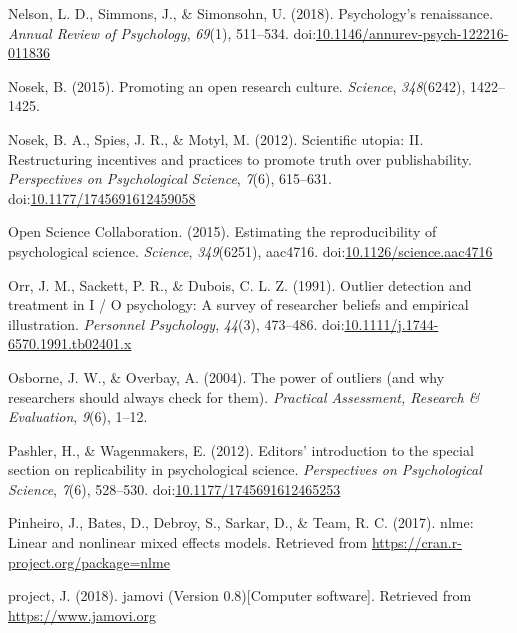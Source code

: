 \documentclass[english,,man]{apa6}
\begin{document}
\leavevmode\hypertarget{ref-Nelson2018}{}%
Nelson, L. D., Simmons, J., \& Simonsohn, U. (2018). Psychology's renaissance. \emph{Annual Review of Psychology}, \emph{69}(1), 511--534. doi:\href{https://doi.org/10.1146/annurev-psych-122216-011836}{10.1146/annurev-psych-122216-011836}

\leavevmode\hypertarget{ref-Nosek2015b}{}%
Nosek, B. (2015). Promoting an open research culture. \emph{Science}, \emph{348}(6242), 1422--1425.

\leavevmode\hypertarget{ref-Nosek2012c}{}%
Nosek, B. A., Spies, J. R., \& Motyl, M. (2012). Scientific utopia: II. Restructuring incentives and practices to promote truth over publishability. \emph{Perspectives on Psychological Science}, \emph{7}(6), 615--631. doi:\href{https://doi.org/10.1177/1745691612459058}{10.1177/1745691612459058}

\leavevmode\hypertarget{ref-ScienceCollaboration2015}{}%
Open Science Collaboration. (2015). Estimating the reproducibility of psychological science. \emph{Science}, \emph{349}(6251), aac4716. doi:\href{https://doi.org/10.1126/science.aac4716}{10.1126/science.aac4716}

\leavevmode\hypertarget{ref-Orr1991}{}%
Orr, J. M., Sackett, P. R., \& Dubois, C. L. Z. (1991). Outlier detection and treatment in I / O psychology: A survey of researcher beliefs and empirical illustration. \emph{Personnel Psychology}, \emph{44}(3), 473--486. doi:\href{https://doi.org/10.1111/j.1744-6570.1991.tb02401.x}{10.1111/j.1744-6570.1991.tb02401.x}

\leavevmode\hypertarget{ref-Osborne2004}{}%
Osborne, J. W., \& Overbay, A. (2004). The power of outliers (and why researchers should always check for them). \emph{Practical Assessment, Research \& Evaluation}, \emph{9}(6), 1--12.

\leavevmode\hypertarget{ref-Pashler2012a}{}%
Pashler, H., \& Wagenmakers, E. (2012). Editors' introduction to the special section on replicability in psychological science. \emph{Perspectives on Psychological Science}, \emph{7}(6), 528--530. doi:\href{https://doi.org/10.1177/1745691612465253}{10.1177/1745691612465253}

\leavevmode\hypertarget{ref-Pinheiro2017}{}%
Pinheiro, J., Bates, D., Debroy, S., Sarkar, D., \& Team, R. C. (2017). nlme: Linear and nonlinear mixed effects models. Retrieved from \url{https://cran.r-project.org/package=nlme}

\leavevmode\hypertarget{ref-jamovi2018}{}%
project, J. (2018). jamovi (Version 0.8){[}Computer software{]}. Retrieved from \url{https://www.jamovi.org}
\end{document}
